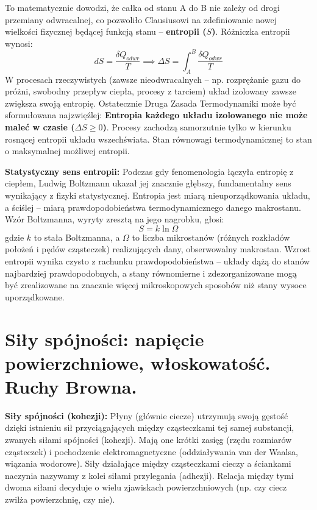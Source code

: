 \documentclass[11pt, a4paper]{article}
\begin{document}
To matematycznie dowodzi, że całka od stanu A do B nie zależy od drogi przemiany odwracalnej, co pozwoliło Clausiusowi na zdefiniowanie nowej wielkości fizycznej będącej funkcją stanu – \textbf{entropii ($S$)}. Różniczka entropii wynosi:
\[
dS = \frac{\delta Q_{odwr}}{T} \implies \Delta S = \int_A^B \frac{\delta Q_{odwr}}{T}
\]
W procesach rzeczywistych (zawsze nieodwracalnych – np. rozprężanie gazu do próżni, swobodny przepływ ciepła, procesy z tarciem) układ izolowany zawsze zwiększa swoją entropię. Ostatecznie Druga Zasada Termodynamiki może być sformułowana najzwięźlej: \textbf{Entropia każdego układu izolowanego nie może maleć w czasie ($\Delta S \ge 0$)}. Procesy zachodzą samorzutnie tylko w kierunku rosnącej entropii układu wszechświata. Stan równowagi termodynamicznej to stan o maksymalnej możliwej entropii.

\textbf{Statystyczny sens entropii:}
Podczas gdy fenomenologia łączyła entropię z ciepłem, Ludwig Boltzmann ukazał jej znacznie głębszy, fundamentalny sens wynikający z fizyki statystycznej. Entropia jest miarą nieuporządkowania układu, a ściślej – miarą prawdopodobieństwa termodynamicznego danego makrostanu.
Wzór Boltzmanna, wyryty zresztą na jego nagrobku, głosi:
\[
S = k \ln \Omega
\]
gdzie $k$ to stała Boltzmanna, a $\Omega$ to liczba mikrostanów (różnych rozkładów położeń i pędów cząsteczek) realizujących dany, obserwowalny makrostan. Wzrost entropii wynika czysto z rachunku prawdopodobieństwa – układy dążą do stanów najbardziej prawdopodobnych, a stany równomierne i zdezorganizowane mogą być zrealizowane na znacznie więcej mikroskopowych sposobów niż stany wysoce uporządkowane.

\section{Siły spójności: napięcie powierzchniowe, włoskowatość. Ruchy Browna.}

\textbf{Siły spójności (kohezji):}
Płyny (głównie ciecze) utrzymują swoją gęstość dzięki istnieniu sił przyciągających między cząsteczkami tej samej substancji, zwanych siłami spójności (kohezji). Mają one krótki zasięg (rzędu rozmiarów cząsteczek) i pochodzenie elektromagnetyczne (oddziaływania van der Waalsa, wiązania wodorowe). Siły działające między cząsteczkami cieczy a ściankami naczynia nazywamy z kolei siłami przylegania (adhezji). Relacja między tymi dwoma siłami decyduje o wielu zjawiskach powierzchniowych (np. czy ciecz zwilża powierzchnię, czy nie).
\end{document}
